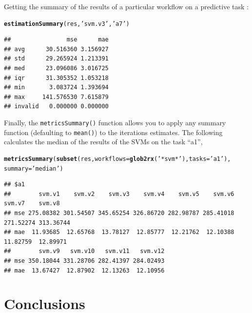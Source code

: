 \documentclass[10pt,a4paper]{article}\usepackage[]{graphicx}\usepackage[]{color}
\makeatletter
\newcommand{\hlstr}[1]{\textcolor[rgb]{0.192,0.494,0.8}{#1}}%
\newcommand{\hlstd}[1]{\textcolor[rgb]{0.345,0.345,0.345}{#1}}%
\newcommand{\hlkwc}[1]{\textcolor[rgb]{0.333,0.667,0.333}{#1}}%
\newcommand{\hlkwd}[1]{\textcolor[rgb]{0.737,0.353,0.396}{\textbf{#1}}}%
\newenvironment{kframe}{%
 \def\at@end@of@kframe{}%
 \ifinner\ifhmode%
  \def\at@end@of@kframe{\end{minipage}}%
  \begin{minipage}{\columnwidth}%
 \fi\fi%
 \def\FrameCommand##1{\hskip\@totalleftmargin \hskip-\fboxsep
 \colorbox{shadecolor}{##1}\hskip-\fboxsep
     \hskip-\linewidth \hskip-\@totalleftmargin \hskip\columnwidth}%
 \MakeFramed {\advance\hsize-\width
   \@totalleftmargin\z@ \linewidth\hsize
   \@setminipage}}%
 {\par\unskip\endMakeFramed%
 \at@end@of@kframe}
\newenvironment{knitrout}{}{} %
\makeatother
\begin{document}
Getting the summary of the results of a particular workflow on a  predictive task :

\begin{knitrout}\footnotesize
{}\color{fgcolor}\begin{kframe}
\begin{alltt}
\hlkwd{estimationSummary}\hlstd{(res,}\hlstr{'svm.v3'}\hlstd{,} \hlstr{'a7'}\hlstd{)}
\end{alltt}
\begin{verbatim}
##                mse      mae
## avg      30.516360 3.156927
## std      29.265924 1.213391
## med      23.096086 3.016725
## iqr      31.305352 1.053218
## min       3.083724 1.393694
## max     141.576530 7.615879
## invalid   0.000000 0.000000
\end{verbatim}
\end{kframe}
\end{knitrout}

Finally, the \texttt{metricsSummary()} function allows you to apply any
summary function (defaulting to \texttt{mean()}) to the iterations estimates. The following
calculates the median of the results of the SVMs on the task ``a1'',

\begin{knitrout}\small
{}\color{fgcolor}\begin{kframe}
\begin{alltt}
\hlkwd{metricsSummary}\hlstd{(}\hlkwd{subset}\hlstd{(res,} \hlkwc{workflows}\hlstd{=}\hlkwd{glob2rx}\hlstd{(}\hlstr{'*svm*'}\hlstd{),} \hlkwc{tasks}\hlstd{=}\hlstr{'a1'}\hlstd{),}
               \hlkwc{summary}\hlstd{=}\hlstr{'median'}\hlstd{)}
\end{alltt}
\begin{verbatim}
## $a1
##        svm.v1    svm.v2    svm.v3    svm.v4    svm.v5    svm.v6    svm.v7    svm.v8
## mse 275.08382 301.54507 345.65254 326.86720 282.98787 285.41018 271.52274 313.36744
## mae  11.93685  12.65768  13.78127  12.85777  12.21762  12.10388  11.82759  12.89971
##        svm.v9   svm.v10   svm.v11   svm.v12
## mse 350.18044 331.28706 282.41397 284.02493
## mae  13.67427  12.87902  12.13263  12.10956
\end{verbatim}
\end{kframe}
\end{knitrout}

\section{Conclusions}
\end{document}
